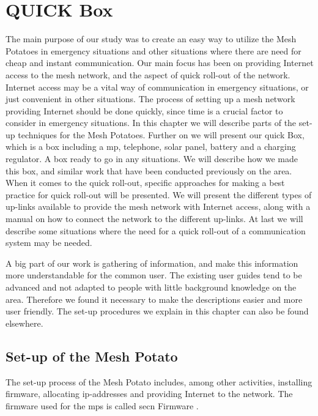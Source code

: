 \chapter{QUICK Box}
\label{chp:quickrollout} 

The main purpose of our study was to create an easy way to utilize the Mesh Potatoes in emergency situations and other situations where there are need for cheap and instant communication. Our main focus has been on providing Internet access to the mesh network, and the aspect of quick roll-out of the network. Internet access may be a vital way of communication in emergency situations, or just convenient in other situations. The process of setting up a mesh network providing Internet should be done quickly, since time is a crucial factor to consider in emergency situations. In this chapter we will describe parts of the set-up techniques for the Mesh Potatoes. Further on we will present our \gls{quick} Box, which is a box including a \gls{mp}, telephone, solar panel, battery and a charging regulator. A box ready to go in any situations. We will describe how we made this box, and similar work that have been conducted previously on the area. When it comes to the quick roll-out, specific approaches for making a best practice for quick roll-out will be presented. We will present the different types of up-links available to provide the mesh network with Internet access, along with a manual on how to connect the network to the different up-links. At last we will describe some situations where the need for a quick roll-out of a communication system may be needed. 

A big part of our work is gathering of information, and make this information more understandable for the common user. The existing user guides tend to be advanced and not adapted to people with little background knowledge on the area. Therefore we found it necessary to make the descriptions easier and more user friendly. The set-up procedures we explain in this chapter can also be found elsewhere. 


\section{Set-up of the Mesh Potato}
The set-up process of the Mesh Potato includes, among other activities, installing firmware, allocating \gls{ip}-addresses and providing Internet to the network. The firmware used for the \glspl{mp} is called \gls{secn} Firmware \cite{ChoosingFirmware}. 

